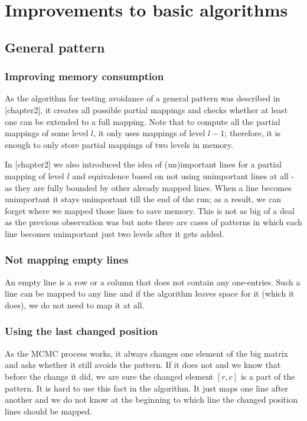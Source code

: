\chapter{Improvements to basic algorithms}

\section{General pattern}

\subsection{Improving memory consumption}
As the algorithm for testing avoidance of a general pattern was described in [chapter2], it creates all possible partial mappings and checks whether at least one can be extended to a full mapping. Note that to compute all the partial mappings of some level $l$, it only uses mappings of level $l-1$; therefore, it is enough to only store partial mappings of two levels in memory.

In [chapter2] we also introduced the idea of (un)important lines for a partial mapping of level $l$ and equivalence based on not using unimportant lines at all - as they are fully bounded by other already mapped lines. When a line becomes unimportant it stays unimportant till the end of the run; as a result, we can forget where we mapped those lines to save memory. This is not as big of a deal as the previous observation was but note there are cases of patterns in which each line becomes unimportant just two levels after it gets added.

\subsection{Not mapping empty lines}
An empty line is a row or a column that does not contain any one-entries. Such a line can be mapped to any line and if the algorithm leaves space for it (which it does), we do not need to map it at all.

\subsection{Using the last changed position}
As the MCMC process works, it always changes one element of the big matrix and asks whether it still avoids the pattern. If it does not and we know that before the change it did, we are sure the changed element $[r,c]$ is a part of the pattern. It is hard to use this fact in the algorithm. It just maps one line after another and we do not know at the beginning to which line the changed position lines should be mapped.

